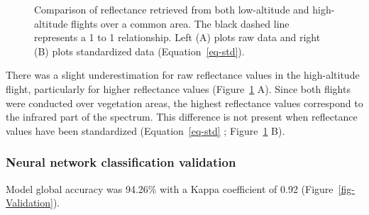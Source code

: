 \documentclass[
  number]{elsarticle}
\begin{document}
\label{cell-fig-CompareRef}
\begin{figure}[H]


\caption{\label{fig-CompareRef}Comparison of reflectance retrieved from
both low-altitude and high-altitude flights over a common area. The
black dashed line represents a 1 to 1 relationship. Left (A) plots raw
data and right (B) plots standardized data (Equation~\ref{eq-std}).}

\end{figure}%

There was a slight underestimation for raw reflectance values in the
high-altitude flight, particularly for higher reflectance values
(Figure~\ref{fig-CompareRef} A). Since both flights were conducted over
vegetation areas, the highest reflectance values correspond to the
infrared part of the spectrum. This difference is not present when
reflectance values have been standardized (Equation~\ref{eq-std} ;
Figure~\ref{fig-CompareRef} B).

\subsubsection{Neural network classification
validation}\label{neural-network-classification-validation}

Model global accuracy was 94.26\% with a Kappa coefficient of 0.92
(Figure~\ref{fig-Validation}).
\end{document}

